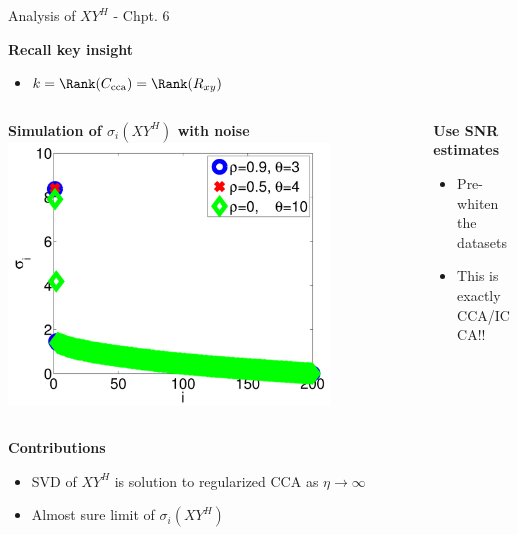 \documentclass[8pt]{beamer}
\newcommand{\Rxy}{R_{xy}}
\newcommand{\Ccca}{C_{\text{cca}}}
\begin{document}
\begin{frame}{Analysis of $XY^H$ - Chpt. 6}

  \textbf{Recall key insight}
  \begin{itemize}
  \item $k = \Rank(\Ccca) = \Rank(\Rxy)$
  \end{itemize}

  \vspace{1ex}

  \begin{columns}[T!]
    \begin{column}{0.5\textwidth}
      \begin{center}
        \textbf{Simulation of $\sigma_i\left(XY^H\right)$ with noise}\\
        \includegraphics[width=0.8\textwidth]{figures/xy_motiv_pres.pdf}
      \end{center}
    \end{column}
    \begin{column}{0.5\textwidth}
      \textbf{Use SNR estimates}
      \begin{itemize}
      \item Pre-whiten the datasets 
      \item This is exactly CCA/ICCA!!
      \end{itemize}
    \end{column}
  \end{columns}

  \vspace{4ex}

  \textbf{Contributions}
  \begin{itemize}
  \item SVD of $XY^H$ is solution to regularized CCA as $\eta\to\infty$
  \item Almost sure limit of $\sigma_i\left(XY^H\right)$
  \end{itemize}

\end{frame}
\end{document}
